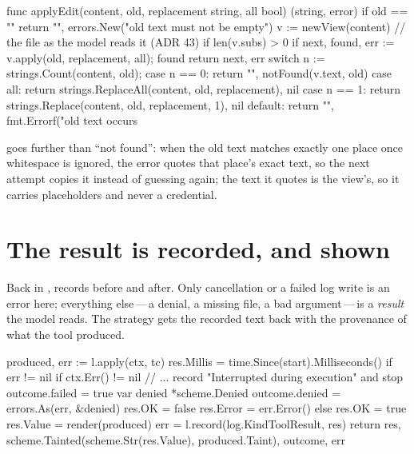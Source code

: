 \begin{go}
func applyEdit(content, old, replacement string, all bool) (string, error) {
    if old == "" {
        return "", errors.New("old text must not be empty")
    }
    v := newView(content) // the file as the model reads it (ADR 43)
    if len(v.subs) > 0 {
        if next, found, err := v.apply(old, replacement, all); found {
            return next, err
        }
    }
    switch n := strings.Count(content, old); {
    case n == 0:
        return "", notFound(v.text, old)
    case all:
        return strings.ReplaceAll(content, old, replacement), nil
    case n == 1:
        return strings.Replace(content, old, replacement, 1), nil
    default:
        return "", fmt.Errorf("old text occurs %
    }
}
\end{go}

 goes further than ``not found'': when the old text matches
exactly one place once whitespace is ignored, the error quotes that place's
exact text, so the next attempt copies it instead of guessing again; the text
it quotes is the view's, so it carries placeholders and never a credential.

\section{The result is recorded, and shown}

Back in ,  records
 before and  after. Only cancellation or
a failed log write is an error here; everything else\,---\,a denial, a
missing file, a bad argument\,---\,is a \emph{result} the model reads. The
strategy gets the recorded text back with the provenance of what the tool
produced.

\begin{go}
produced, err := l.apply(ctx, tc)
res.Millis = time.Since(start).Milliseconds()
if err != nil {
    if ctx.Err() != nil {
        // ... record "Interrupted during execution" and stop
    }
    outcome.failed = true
    var denied *scheme.Denied
    outcome.denied = errors.As(err, &denied)
    res.OK = false
    res.Error = err.Error()
} else {
    res.OK = true
    res.Value = render(produced)
}
err = l.record(log.KindToolResult, res)
return res, scheme.Tainted(scheme.Str(res.Value), produced.Taint), outcome, err
\end{go}

